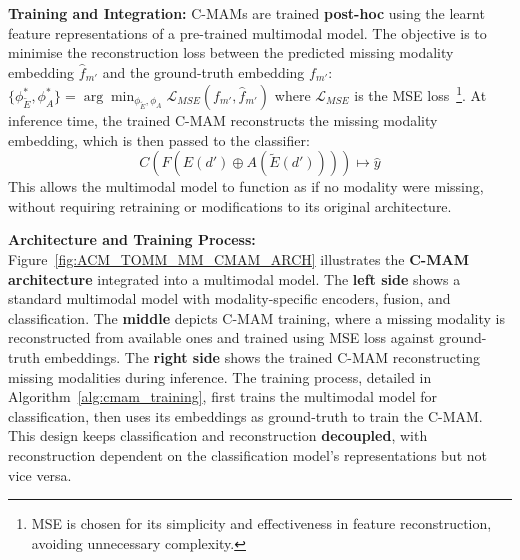 \textbf{Training and Integration:} C-MAMs are trained \textbf{post-hoc} using the learnt feature representations of a pre-trained multimodal model. The objective is to minimise the reconstruction loss between the predicted missing modality embedding $\hat{f}_{m'}$ and the ground-truth embedding $f_{m'}$: $\{\phi_{\tilde{E}}^*, \phi_{A}^*\} = \arg\min_{\phi_{\tilde{E}}, \phi_{A}} \mathcal{L}_{MSE}(f_{m'}, \hat{f}_{m'})$
where $\mathcal{L}_{MSE}$ is the MSE loss~\footnote{MSE is chosen for its simplicity and effectiveness in feature reconstruction, avoiding unnecessary complexity.}. At inference time, the trained C-MAM reconstructs the missing modality embedding, which is then passed to the classifier:
\begin{equation*}
\boxed{
C(F(E(d') \oplus A(\tilde{E}(d')))) \mapsto \hat{y}
}
\end{equation*}
This allows the multimodal model to function as if no modality were missing, without requiring retraining or modifications to its original architecture.

\textbf{Architecture and Training Process:} Figure~\ref{fig:ACM_TOMM_MM_CMAM_ARCH} illustrates the \textbf{C-MAM architecture} integrated into a multimodal model. The \textbf{left side} shows a standard multimodal model with modality-specific encoders, fusion, and classification. The \textbf{middle} depicts C-MAM training, where a missing modality is reconstructed from available ones and trained using MSE loss against ground-truth embeddings. The \textbf{right side} shows the trained C-MAM reconstructing missing modalities during inference. The training process, detailed in Algorithm~\ref{alg:cmam_training}, first trains the multimodal model for classification, then uses its embeddings as ground-truth to train the C-MAM. This design keeps classification and reconstruction \textbf{decoupled}, with reconstruction dependent on the classification model's representations but not vice versa.
